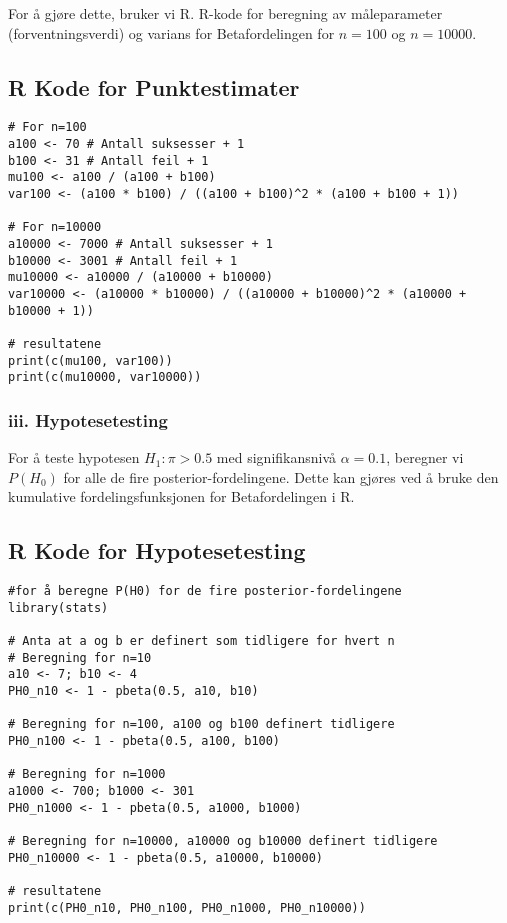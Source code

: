 \documentclass[12pt]{article}
\begin{document}
For å gjøre dette, bruker vi R. R-kode for beregning av måleparameter (forventningsverdi) og varians for Betafordelingen for $n=100$ og $n=10000$.

\subsection{R Kode for Punktestimater}
\begin{verbatim}
# For n=100
a100 <- 70 # Antall suksesser + 1
b100 <- 31 # Antall feil + 1
mu100 <- a100 / (a100 + b100)
var100 <- (a100 * b100) / ((a100 + b100)^2 * (a100 + b100 + 1))

# For n=10000
a10000 <- 7000 # Antall suksesser + 1
b10000 <- 3001 # Antall feil + 1
mu10000 <- a10000 / (a10000 + b10000)
var10000 <- (a10000 * b10000) / ((a10000 + b10000)^2 * (a10000 + b10000 + 1))

# resultatene
print(c(mu100, var100))
print(c(mu10000, var10000))
\end{verbatim}

\subsubsection{iii. Hypotesetesting}
For å teste hypotesen $H_1: \pi > 0.5$ med signifikansnivå $\alpha = 0.1$, beregner vi $P(H_0)$ for alle de fire posterior-fordelingene. Dette kan gjøres ved å bruke den kumulative fordelingsfunksjonen for Betafordelingen i R.

\subsection{R Kode for Hypotesetesting}
\begin{verbatim}
#for å beregne P(H0) for de fire posterior-fordelingene
library(stats)

# Anta at a og b er definert som tidligere for hvert n
# Beregning for n=10
a10 <- 7; b10 <- 4
PH0_n10 <- 1 - pbeta(0.5, a10, b10)

# Beregning for n=100, a100 og b100 definert tidligere
PH0_n100 <- 1 - pbeta(0.5, a100, b100)

# Beregning for n=1000
a1000 <- 700; b1000 <- 301
PH0_n1000 <- 1 - pbeta(0.5, a1000, b1000)

# Beregning for n=10000, a10000 og b10000 definert tidligere
PH0_n10000 <- 1 - pbeta(0.5, a10000, b10000)

# resultatene
print(c(PH0_n10, PH0_n100, PH0_n1000, PH0_n10000))
\end{verbatim}
\end{document}
